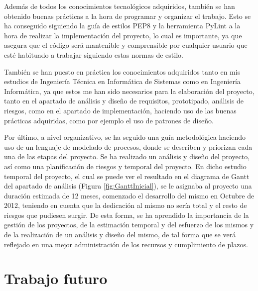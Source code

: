 Además de todos los conocimientos tecnológicos adquiridos, también se han
obtenido buenas prácticas a la hora de programar y organizar el trabajo. Esto se
ha conseguido siguiendo la guía de estilos PEP8 y la herramienta PyLint a la
hora de realizar la implementación del proyecto, lo cual es importante, ya que
asegura que el código será mantenible y comprensible por cualquier usuario que
esté habituado a trabajar siguiendo estas normas de estilo.

También se han puesto en práctica los conocimientos adquiridos tanto en mis
estudios de Ingeniería Técnica en Informática de Sistemas como en Ingeniería
Informática, ya que estos me han sido necesarios para la elaboración del
proyecto, tanto en el apartado de análisis y diseño de requisitos, prototipado,
análisis de riesgos, como en el apartado de implementación, haciendo uso de las
buenas prácticas adquiridas, como por ejemplo el uso de patrones de diseño.

Por último, a nivel organizativo, se ha seguido una guía metodológica haciendo
uso de un lenguaje de modelado de procesos, donde se describen y priorizan cada
una de las etapas del proyecto. Se ha realizado un análisis y diseño del
proyecto, así como una planificación de riesgos y temporal del proyecto. En
dicho estudio temporal del proyecto, el cual se puede ver el resultado en el
diagrama de Gantt del apartado de análisis (Figura \ref{fig:GanttInicial}), se
le asignaba al proyecto una duración estimada de 12 meses, comenzado el
desarrollo del mismo en Octubre de 2012, teniendo en cuenta que la dedicación al
mismo no sería total y el resto de riesgos que pudiesen surgir. De esta forma,
se ha aprendido la importancia de la gestión de los proyectos, de la estimación
temporal y del esfuerzo de los mismos y de la realización de un análisis y
diseño del mismo, de tal forma que se verá reflejado en una mejor administración
de los recursos y cumplimiento de plazos.



\section{Trabajo futuro}

